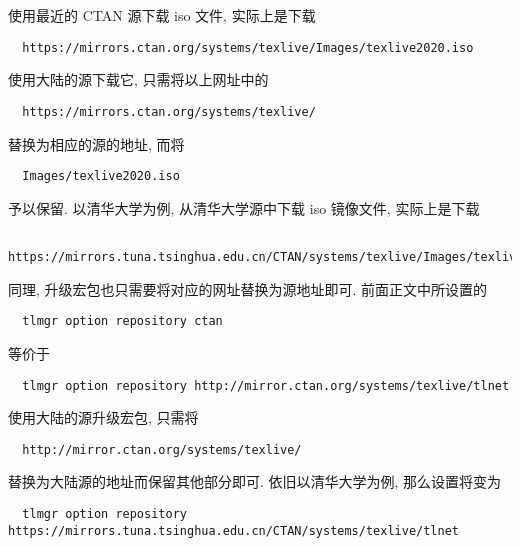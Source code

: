 使用最近的 CTAN 源下载 iso 文件,
实际上是下载
\begin{lstlisting}
  https://mirrors.ctan.org/systems/texlive/Images/texlive2020.iso
\end{lstlisting}
使用大陆的源下载它,
只需将以上网址中的
\begin{lstlisting}
  https://mirrors.ctan.org/systems/texlive/
\end{lstlisting}
替换为相应的源的地址,
而将
\begin{lstlisting}
  Images/texlive2020.iso
\end{lstlisting}
予以保留.
以清华大学为例,
从清华大学源中下载 iso 镜像文件,
实际上是下载
\begin{lstlisting}
  https://mirrors.tuna.tsinghua.edu.cn/CTAN/systems/texlive/Images/texlive2020.iso
\end{lstlisting}

同理,
升级宏包也只需要将对应的网址替换为源地址即可.
前面正文中所设置的
\begin{lstlisting}
  tlmgr option repository ctan
\end{lstlisting}
等价于
\begin{lstlisting}
  tlmgr option repository http://mirror.ctan.org/systems/texlive/tlnet
\end{lstlisting}
使用大陆的源升级宏包,
只需将
\begin{lstlisting}
  http://mirror.ctan.org/systems/texlive/
\end{lstlisting}
替换为大陆源的地址而保留其他部分即可.
依旧以清华大学为例,
那么设置将变为
\begin{lstlisting}
  tlmgr option repository https://mirrors.tuna.tsinghua.edu.cn/CTAN/systems/texlive/tlnet
\end{lstlisting}
